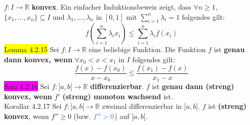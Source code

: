 \documentclass[landscape, 10pt]{article}
\newcommand{\R}{\mathbb{R}}
\begin{document}
\begin{multicols}{3}
{                     $f:I\longrightarrow\R$} 
                     \textbf{konvex}. Ein einfacher 
                     Induktionsbeweis zeigt, dass
                     \textcolor{NavyBlue}{
                     $\forall n\geqslant1$},\\
                     \textcolor{NavyBlue}{$\{x_1,...,x_n\}
                     \subseteq I$} 
                     und \textcolor{NavyBlue}{
                     $\lambda_1,...,\lambda_n$} in 
                     \textcolor{NavyBlue}{$[0,1]$} mit 
                     \textcolor{NavyBlue}{
                     $\sum_{i=1}^n\lambda_i=1$}
                     folgendes gilt: 
                     \begin{equation*}
                            f(\sum_{i=1}^n\lambda_i x_i)
                            \leqslant\sum_{i=1}^n\lambda_if(x_i)
                     \end{equation*}
              \colorbox{yellow}{Lemma 4.2.15} 
                     Sei \textcolor{NavyBlue}{
                     $f:I\longrightarrow\R$} 
                     eine beliebige Funktion. Die Funktion 
                     \textcolor{NavyBlue}{$f$}
                     ist \textbf{genau dann konvex, wenn} 
                     \textcolor{NavyBlue}{$\forall x_0<x<x_1$} in 
                     \textcolor{NavyBlue}{$I$}
                     folgendes gilt: 
                     \begin{equation*}
                           \frac{f(x)-f(x_0)}{x-x_0}
                     \leqslant\frac{f(x_1)-f(x)}{x_1-x} 
                     \end{equation*}
              \colorbox{magenta}{Satz 4.2.16} 
                     Sei \textcolor{NavyBlue}{
                     $f:]a,b[\longrightarrow\R$}
                     \textbf{differenzierbar}. 
                     \textcolor{NavyBlue}{$f$} ist 
                     \textbf{genau dann (streng) konvex, wenn} 
                     \textcolor{NavyBlue}{$f'$} 
                     \textbf{(streng) monoton
                     wachsend} ist.\\
              \colorbox{BurntOrange}{Korollar 4.2.17} 
                     Sei \textcolor{NavyBlue}{
                     $f:]a,b[\longrightarrow\R$}
                     zweimal differenzierbar in 
                     \textcolor{NavyBlue}{$]a,b[$}. 
                     \textcolor{NavyBlue}{$f$} ist \textbf{(streng) konvex}, 
                     wenn \textcolor{NavyBlue}{
                     $f''\geqslant0$} (bzw. 
                     $\textcolor{NavyBlue}{f''>0}$) auf 
                     \textcolor{NavyBlue}{$]a,b[$}.

\end{multicols}
\end{document}

